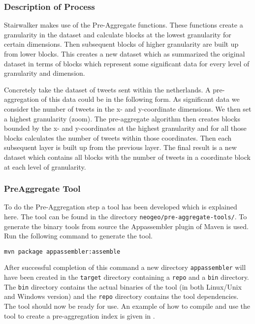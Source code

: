 \subsubsection{Description of Process}
Stairwalker makes use of the Pre-Aggregate functions. These functions create a granularity in the dataset and calculate blocks at the lowest granularity for certain dimensions. Then subsequent blocks of higher granularity are built up from lower blocks. This creates a new dataset which as summarized the original dataset in terms of blocks which represent some significant data for every level of granularity and dimension.

Concretely take the dataset of tweets sent within the netherlands. A pre-aggregation of this data could be in the following form. As significant data we consider the number of tweets in the x- and y-coordinate dimensions. We then set a highest granularity (zoom). The pre-aggregate algorithm then creates blocks bounded by the x- and y-coordinates at the highest granularity and for all those blocks calculates the number of tweets within those coordinates. Then each subsequent layer is built up from the previous layer. The final result is a new dataset which contains all blocks with the number of tweets in a coordinate block at each level of granularity.

\subsubsection{PreAggregate Tool}
\label{sec:preaggtool}
To do the Pre-Aggregation step a tool has been developed which is explained here. The tool can be found in the directory \lstinline|neogeo/pre-aggregate-tools/|. To generate the binary tools from source the Appassembler plugin of Maven is used. Run the following command to generate the tool.
\begin{lstlisting}
mvn package appassembler:assemble
\end{lstlisting}
After successful completion of this command a new directory \lstinline|appassembler| will have been created in the \lstinline|target| directory containing a \lstinline|repo| and a \lstinline|bin| directory. The \lstinline|bin| directory contains the actual binaries of the tool (in both Linux/Unix and Windows version) and the \lstinline|repo| directory contains the tool dependencies. The tool should now be ready for use. An example of how to compile and use the tool to create a pre-aggregation index is given in .

